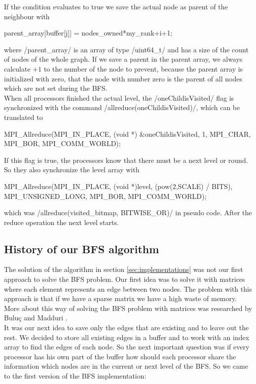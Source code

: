 \documentclass[12pt,a4paper]{article}
\begin{document}
If the condition evaluates to true we save the actual node as parent of the neighbour with
\begin{ccode}
parent_array[buffer[j]] = nodes_owned*my_rank+i+1;
\end{ccode}
where \cinline/parent_array/ is an array of type \cinline/uint64_t/ and has a size of the count of nodes of the whole graph. If we save a parent in the parent array, we always calculate \(+1\) to the number of the node to prevent, because the parent array is initialized with zero, that the node with number zero is the parent of all nodes which are not set during the BFS.\\
When all processors finished the actual level, the \cinline/oneChildisVisited/ flag is synchronized with the command \cinline/allreduce(oneChildisVisited)/, which can be translated to
\begin{ccode}
MPI_Allreduce(MPI_IN_PLACE, (void *) &oneChildisVisited, 1, MPI_CHAR, MPI_BOR, MPI_COMM_WORLD);
\end{ccode}
If this flag is true, the processors know that there must be a next level or round. So they also synchronize the level array with
\begin{ccode}
MPI_Allreduce(MPI_IN_PLACE, (void *)level, (pow(2,SCALE) / BITS), MPI_UNSIGNED_LONG, MPI_BOR, MPI_COMM_WORLD);
\end{ccode}
which was \cinline/allreduce(visited_bitmap, BITWISE_OR)/ in pseudo code. After the reduce operation the next level starts.

\subsection{History of our BFS algorithm}
\label{sec:versions}

The solution of the algorithm in section \ref{sec:implementations} was not our first approach to solve the BFS problem. Our first idea was to solve it with matrices where each element represents an edge between two nodes. The problem with this approach is that if we have a sparse matrix we have a high waste of memory. More about this way of solving the BFS problem with matrices was researched by Buluç and Madduri \cite{matrices}.\\
It was our next idea to save only the edges that are existing and to leave out the rest. We decided to store all existing edges in a buffer and to work with an index array to find the edges of each node. So the next important question was if every processor has his own part of the buffer how should each processor share the information which nodes are in the current or next level of the BFS. So we came to the first version of the BFS implementation:
\end{document}

